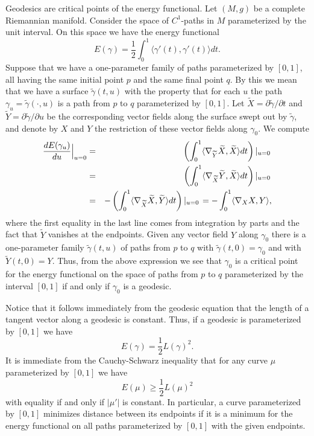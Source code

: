 Geodesics are critical points of the energy functional. Let $(M,g)$
be a complete Riemannian manifold. Consider the space of $C^1$-paths
in $M$ parameterized by the unit interval. On this space we have the
energy functional
$$E(\gamma)=\frac{1}{2}\int_{0}^{1}\langle \gamma'(t),\gamma'(t)\rangle dt.$$
 Suppose that we have a one-parameter family of  paths parameterized by
 $[0,1]$,
 all having the same initial point $p$ and the same final point $q$.
 By this we mean that we have a surface $\tilde\gamma(t,u)$ with the property that for each
 $u$ the path $\gamma_u=\tilde\gamma(\cdot,u)$ is a path from $p$ to $q$ parameterized by $[0,1]$.
 Let $\widetilde X=\partial\tilde \gamma/\partial t$ and
 $\widetilde Y=\partial\tilde \gamma/\partial u$ be the corresponding vector
 fields along the surface swept out by $\tilde \gamma$, and denote by $X$ and $Y$ the restriction
 of these vector fields along $\gamma_0$.
 We compute
 \begin{eqnarray*}
 \frac{dE(\gamma_u)}{du}\Bigl|_{u=0}\Bigr.& = & \left( \int_0^1\langle \nabla_{\widetilde Y}\widetilde X,\widetilde
 X\rangle dt\right)\left|_{u=0}\right. \\
 & = & \left(\int_0^1\langle\nabla_{\widetilde X}\widetilde Y,\widetilde
 X\rangle dt \right)\left|_{u=0}\right.\\
 & = & -\left( \int_0^1\langle\nabla_{\widetilde X}\widetilde X,\widetilde
 Y\rangle dt\right)\left|_{u=0}\right.=-\int_0^1\langle\nabla_XX,Y\rangle,
\end{eqnarray*}
where the first equality in the last line comes from integration by
parts and the fact that $\widetilde Y$ vanishes at the endpoints.
Given any vector field $Y$ along $\gamma_0$ there is a one-parameter
family $\tilde \gamma(t,u)$ of paths from $p$ to $q$ with $\tilde
\gamma(t,0)=\gamma_0$ and with $\widetilde Y(t,0)=Y$. Thus, from the
above expression we see that $\gamma_0$ is a critical point for the
energy functional on the space of paths from $p$ to $q$
parameterized by the interval $[0,1]$ if and only if $\gamma_0$ is a
geodesic.

Notice that it follows immediately from the geodesic equation that
the length of a tangent vector along a geodesic is constant. Thus,
if a geodesic is parameterized by $[0,1]$ we have
$$E(\gamma)=\frac{1}{2}L(\gamma)^2.$$
It is immediate from the Cauchy-Schwarz inequality that for any
curve $\mu$ parameterized by $[0,1]$ we have
$$E(\mu)\ge \frac{1}{2}L(\mu)^2$$
with equality if and only if $|\mu'|$ is constant. In particular, a
curve parameterized by $[0,1]$ minimizes distance between its
endpoints if it is a minimum for the energy functional on all paths
parameterized by $[0,1]$ with the given endpoints.






